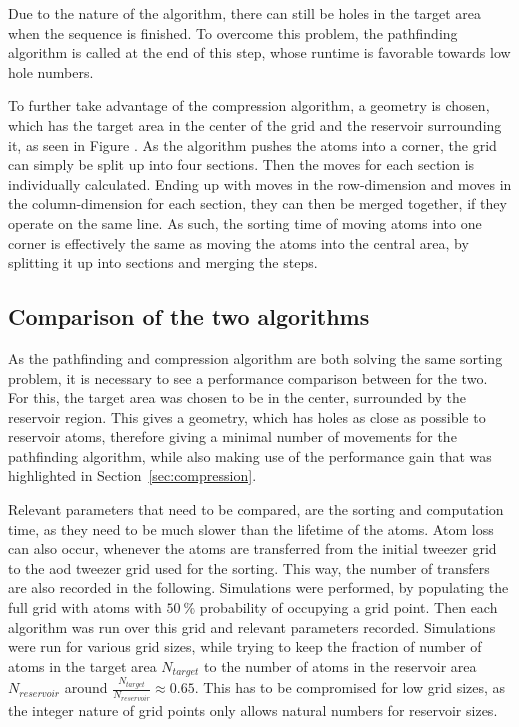 Due to the nature of the algorithm, there can still be holes in the target area when the sequence is finished. To overcome this problem, the pathfinding algorithm is called at the end of this step, whose runtime is favorable towards low hole numbers.

To further take advantage of the compression algorithm, a geometry is chosen, which has the target area in the center of the grid and the reservoir surrounding it, as seen in Figure . As the algorithm pushes the atoms into a corner, the grid can simply be split up into four sections. Then the moves for each section is individually calculated. Ending up with moves in the row-dimension and moves in the column-dimension for each section, they can then be merged together, if they operate on the same line. As such, the sorting time of moving atoms into one corner is effectively the same as moving the atoms into the central area, by splitting it up into sections and merging the steps.

\subsection{Comparison of the two algorithms}

As the pathfinding and compression algorithm are both solving the same sorting problem, it is necessary to see a performance comparison between for the two. For this, the target area was chosen to be in the center, surrounded by the reservoir region. This gives a geometry, which has holes as close as possible to reservoir atoms, therefore giving a minimal number of movements for the pathfinding algorithm, while also making use of the performance gain that was highlighted in Section~\ref{sec:compression}.

Relevant parameters that need to be compared, are the sorting and computation time, as they need to be much slower than the lifetime of the atoms. Atom loss can also occur, whenever the atoms are transferred from the initial tweezer grid to the \ac{aod} tweezer grid used for the sorting. This way, the number of transfers are also recorded in the following.
Simulations were performed, by populating the full grid with atoms with $\SI{50}{\percent}$ probability of occupying a grid point. Then each algorithm was run over this grid and relevant parameters recorded. Simulations were run for various grid sizes, while trying to keep the fraction of number of atoms in the target area $N_{target}$ to the number of atoms in the reservoir area $N_{reservoir}$ around $\frac{N_{target}}{N_{reservoir}} \approx 0.65$. This has to be compromised for low grid sizes, as the integer nature of grid points only allows natural numbers for reservoir sizes.

